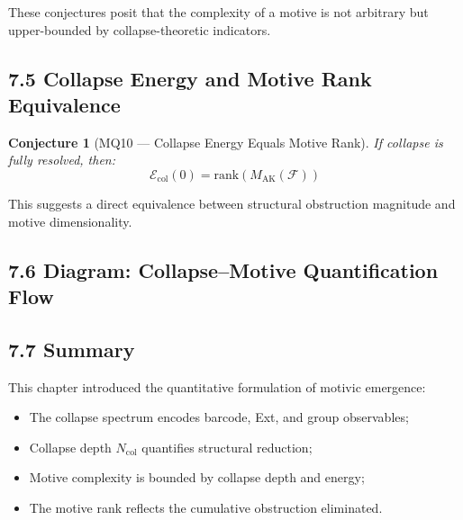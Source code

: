 \documentclass[11pt]{article}
\newtheorem{conjecture}{Conjecture}[section]
\begin{document}
These conjectures posit that the complexity of a motive is not arbitrary but upper-bounded by collapse-theoretic indicators.

\subsection{7.5 Collapse Energy and Motive Rank Equivalence}

\begin{conjecture}[MQ10 — Collapse Energy Equals Motive Rank]
If collapse is fully resolved, then:
\[
\mathcal{E}_{\mathrm{col}}(0) = \mathrm{rank}(M_{\mathrm{AK}}(\mathcal{F}))
\]
\end{conjecture}

This suggests a direct equivalence between structural obstruction magnitude and motive dimensionality.

\subsection{7.6 Diagram: Collapse–Motive Quantification Flow}

\begin{center}
\end{center}


\subsection{7.7 Summary}

This chapter introduced the quantitative formulation of motivic emergence:

\begin{itemize}
    \item The collapse spectrum encodes barcode, Ext, and group observables;
    \item Collapse depth $N_{\mathrm{col}}$ quantifies structural reduction;
    \item Motive complexity is bounded by collapse depth and energy;
    \item The motive rank reflects the cumulative obstruction eliminated.
\end{itemize}
\end{document}
